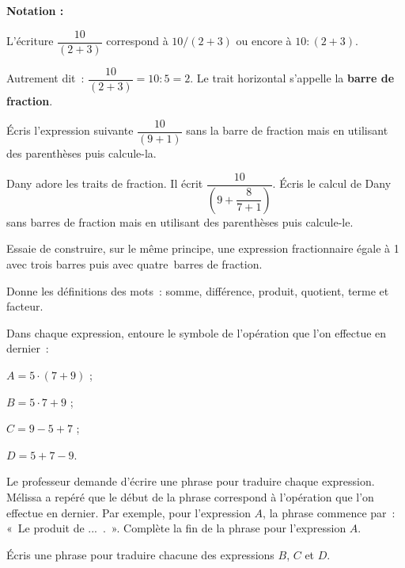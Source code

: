 \begin{activite}

\textbf{Notation :}

L’écriture $\dfrac{10}{(2 + 3)}$ correspond à $10 / (2 + 3)$ ou encore à $10 : (2 + 3)$.

Autrement dit : $\dfrac{10}{(2 + 3)} = 10 : 5 = 2$. Le trait horizontal s'appelle la \textbf{barre de fraction}.

\begin{partie}
Écris l'expression suivante $\dfrac{10}{(9 + 1)}$ sans la barre de fraction mais en utilisant des parenthèses puis calcule-la.
\end{partie}


\begin{partie}
Dany adore les traits de fraction. Il écrit $\dfrac{10}{(9 + \dfrac{8}{7+1})}$. Écris le calcul de Dany sans barres de fraction mais en utilisant des parenthèses puis calcule-le.
\end{partie}


\begin{partie}
Essaie de construire, sur le même principe, une expression fractionnaire égale à 1 avec trois barres puis avec quatre barres de fraction.
\end{partie}

\end{activite}



\begin{activite}

\begin{partie}
Donne les définitions des mots : somme, différence, produit, quotient, terme et facteur.
\end{partie}

\begin{partie}
Dans chaque expression, entoure le symbole de l'opération que l'on effectue en dernier :
\begin{colitemize}{4}
 \item $A = 5 \cdot (7 + 9)$ ;
 \item $B = 5 \cdot 7 + 9$ ;
 \item $C = 9 - 5 + 7$ ;
 \item $D = 5 + 7 - 9$.
 \end{colitemize}
\end{partie}

\begin{partie}
Le professeur demande d'écrire une phrase pour traduire chaque expression. Mélissa a repéré que le début de la phrase correspond à l'opération que l'on effectue en dernier. Par exemple, pour l'expression $A$, la phrase commence par : « Le produit de ... . ». Complète la fin de la phrase pour l'expression $A$.
\end{partie}

\begin{partie}
Écris une phrase pour traduire chacune des expressions $B$, $C$ et $D$.
\end{partie}

\end{activite}

